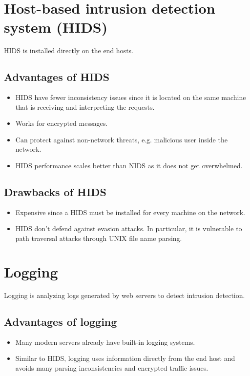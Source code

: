\section{Host-based intrusion detection system (HIDS)}
HIDS is installed directly on the end hosts.

\subsection{Advantages of HIDS}
\begin{itemize}
    \item HIDS have fewer inconsistency issues since it is located on the same machine that is receiving and interpreting the requests.
    
    \item Works for encrypted messages.
    
    \item Can protect against non-network threats, e.g. malicious user inside the network.
    
    \item HIDS performance scales better than NIDS as it does not get overwhelmed.
\end{itemize}

\subsection{Drawbacks of HIDS}
\begin{itemize}
    \item Expensive since a HIDS must be installed for every machine on the network.
    
    \item HIDS don't defend against evasion attacks. In particular, it is vulnerable to path traversal attacks through UNIX file name parsing.
\end{itemize}

\section{Logging}
Logging is analyzing logs generated by web servers to detect intrusion detection.

\subsection{Advantages of logging}
\begin{itemize}
    \item Many modern servers already have built-in logging systems.
    \item Similar to HIDS, logging uses information directly from the end host and avoids many parsing inconsistencies and encrypted traffic issues.
\end{itemize}

